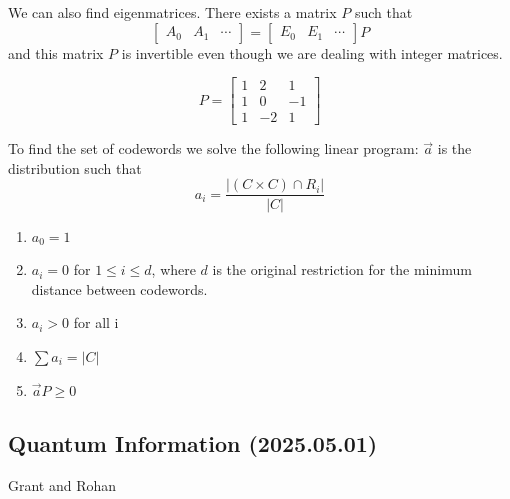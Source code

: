 \documentclass[12pt]{article}
\theoremstyle{remark}
\begin{document}
We can also find eigenmatrices. There exists a matrix $P$ such that 
\[\begin{bmatrix}
    A_0 & A_1 & \cdots
\end{bmatrix} = \begin{bmatrix}
    E_0 & E_1 & \cdots
\end{bmatrix} P\]
and this matrix $P$ is invertible even though we are dealing with integer matrices. 

\[P = \begin{bmatrix}
    1 & 2 & 1 \\ 1 & 0 & -1 \\ 1 & -2 & 1
\end{bmatrix}\]

To find the set of codewords we solve the following linear program:
$\vec a$ is the distribution such that
\[a_i = \frac{|(C\times C) \cap R_i|}{|C|}\]
\begin{enumerate}
    \item $a_0 = 1$
    \item $a_i = 0$ for $1 \le i \le d$, where $d$ is the original restriction for the minimum distance between codewords.
    \item $a_i > 0$ for all i
    \item $\sum a_i = |C|$
    \item $\vec a P \ge 0$
\end{enumerate}

\subsection{Quantum Information (2025.05.01)}
Grant and Rohan
\end{document}
